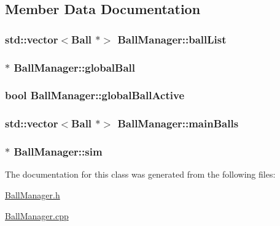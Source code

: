 \subsection{Member Data Documentation}
\hypertarget{classBallManager_a7a32cb0f1dce0a3c51430ead4918a21e}{
\subsubsection[{ball\-List}]{\setlength{\rightskip}{0pt plus 5cm}std\-::vector$<${\bf Ball} $\ast$$>$ Ball\-Manager\-::ball\-List\hspace{0.3cm}{\ttfamily [private]}}}\label{classBallManager_a7a32cb0f1dce0a3c51430ead4918a21e}
\hypertarget{classBallManager_a9fbb6953ccffca39d124c4867a03d6e5}{
\subsubsection[{global\-Ball}]{$\ast$ Ball\-Manager\-::global\-Ball}}\label{classBallManager_a9fbb6953ccffca39d124c4867a03d6e5}
\hypertarget{classBallManager_a4f86decb02dc070a4ddf4d408620acf4}{
\subsubsection[{global\-Ball\-Active}]{\setlength{\rightskip}{0pt plus 5cm}bool Ball\-Manager\-::global\-Ball\-Active\hspace{0.3cm}{\ttfamily [private]}}}\label{classBallManager_a4f86decb02dc070a4ddf4d408620acf4}
\hypertarget{classBallManager_a3de8a29f89c02241ef9dd1bc85bcb6f8}{
\subsubsection[{main\-Balls}]{\setlength{\rightskip}{0pt plus 5cm}std\-::vector$<${\bf Ball} $\ast$$>$ Ball\-Manager\-::main\-Balls\hspace{0.3cm}{\ttfamily [private]}}}\label{classBallManager_a3de8a29f89c02241ef9dd1bc85bcb6f8}
\hypertarget{classBallManager_a4916de0948df0af060f6ada4d21284a7}{
\subsubsection[{sim}]{$\ast$ Ball\-Manager\-::sim\hspace{0.3cm}{\ttfamily [private]}}}\label{classBallManager_a4916de0948df0af060f6ada4d21284a7}


The documentation for this class was generated from the following files\-:\begin{DoxyCompactItemize}
\item 
\hyperlink{BallManager_8h}{Ball\-Manager.\-h}\item 
\hyperlink{BallManager_8cpp}{Ball\-Manager.\-cpp}\end{DoxyCompactItemize}
